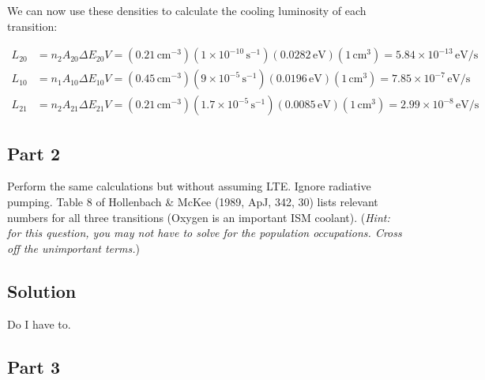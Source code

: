 \documentclass[12pt]{article}
\begin{document}
We can now use these densities to calculate the cooling luminosity of each transition:

\begin{equation*}
\begin{split}
L_{20} &= n_2A_{20}\Delta E_{20}V = (0.21\,\mathrm{cm^{-3}})(1\times10^{-10}\,\mathrm{s^{-1}})(0.0282\,\mathrm{eV})(1\,\mathrm{cm^3}) = 5.84\times10^{-13} \,\mathrm{eV/s}\\
L_{10} &= n_1A_{10}\Delta E_{10}V = (0.45\,\mathrm{cm^{-3}})(9\times10^{-5}\,\mathrm{s^{-1}})(0.0196\,\mathrm{eV})(1\,\mathrm{cm^3}) = 7.85\times10^{-7} \,\mathrm{eV/s}\\
L_{21} &= n_2A_{21}\Delta E_{21}V = (0.21\,\mathrm{cm^{-3}})(1.7\times10^{-5}\,\mathrm{s^{-1}})(0.0085\,\mathrm{eV})(1\,\mathrm{cm^3})= 2.99\times10^{-8} \,\mathrm{eV/s}
\end{split}
\end{equation*}


\subsection*{Part 2}

Perform the same calculations but without assuming LTE. Ignore radiative pumping. Table 8 of Hollenbach & McKee (1989, ApJ, 342, 30) lists relevant numbers for all three transitions (Oxygen is an important ISM coolant). (\textit{Hint: for this question, you may not have to solve for the population occupations. Cross off the unimportant terms.})


\subsection*{Solution}

Do I have to.


\subsection*{Part 3}
\end{document}
